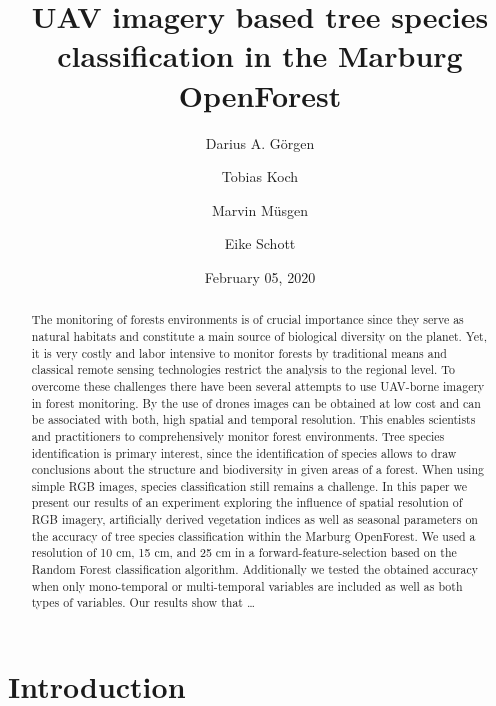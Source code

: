 \documentclass[]{article}
\title{UAV imagery based tree species classification in the Marburg OpenForest}
\author{Darius A. Görgen \and Tobias Koch \and Marvin Müsgen \and Eike Schott}
\date{February 05, 2020}
\begin{document}
\maketitle
\begin{abstract}
The monitoring of forests environments is of crucial importance since
they serve as natural habitats and constitute a main source of
biological diversity on the planet. Yet, it is very costly and labor
intensive to monitor forests by traditional means and classical remote
sensing technologies restrict the analysis to the regional level. To
overcome these challenges there have been several attempts to use
UAV-borne imagery in forest monitoring. By the use of drones images can
be obtained at low cost and can be associated with both, high spatial
and temporal resolution. This enables scientists and practitioners to
comprehensively monitor forest environments. Tree species identification
is primary interest, since the identification of species allows to draw
conclusions about the structure and biodiversity in given areas of a
forest. When using simple RGB images, species classification still
remains a challenge. In this paper we present our results of an
experiment exploring the influence of spatial resolution of RGB imagery,
artificially derived vegetation indices as well as seasonal parameters
on the accuracy of tree species classification within the Marburg
OpenForest. We used a resolution of 10 cm, 15 cm, and 25 cm in a
forward-feature-selection based on the Random Forest classification
algorithm. Additionally we tested the obtained accuracy when only
mono-temporal or multi-temporal variables are included as well as both
types of variables. Our results show that \ldots{}
\end{abstract}

{
\setcounter{tocdepth}{2}
\tableofcontents
}
\hypertarget{introduction}{%
\section{Introduction}\label{introduction}}
\end{document}
